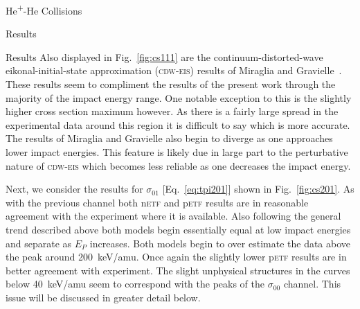 \documentclass[letterpaper, 11 pt]{report}
\begin{document}
\begin{chapter}{\texorpdfstring{He\textsuperscript{+}}{He+}-He Collisions \label{chap:hephe}}
\begin{section}{Results \label{sec:hephe-disc}}
\begin{subsection}{Results \label{sec:hephe-res}}
         Also displayed in Fig.~\ref{fig:cs111} are the continuum-distorted-wave eikonal-initial-state
         approximation (\textsc{cdw-eis}) results of Miraglia and Gravielle~\cite{MG-10}. These results
         seem to compliment the results of the present work through the majority of the impact energy
         range. One notable exception to this is the slightly higher cross section maximum however. As
         there is a fairly large spread in the experimental data around this region it is difficult to
         say which is more accurate. The results of Miraglia and Gravielle also begin to diverge as one
         approaches lower impact energies. This feature is likely due in large part to the perturbative
         nature of \textsc{cdw-eis} which becomes less reliable as one decreases the impact energy.

         Next, we consider the results for $\sigma_{01}$ [Eq.~\eqref{eq:tpi201}] shown in
         Fig.~\ref{fig:cs201}. As with the previous channel both n\textsc{etf} and p\textsc{etf} results
         are in reasonable agreement with the experiment where it is available. Also following the
         general trend described above both models begin essentially equal at low impact energies and
         separate as $E_P$ increases. Both models begin to over estimate the data above the peak around
         200~keV/amu. Once again the slightly lower p\textsc{etf} results are in better agreement with
         experiment. The slight unphysical structures in the curves below 40~keV/amu seem to correspond
         with the peaks of the $\sigma_{00}$ channel. This issue will be discussed in greater detail
         below.


\end{subsection}
\end{section}
\end{chapter}
\end{document}
